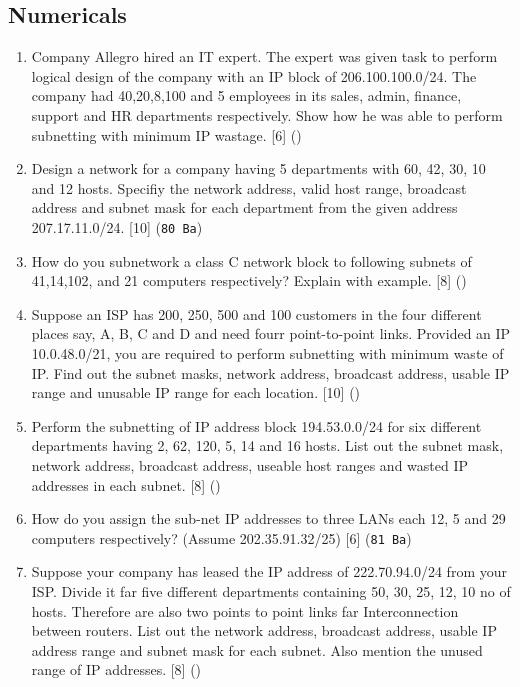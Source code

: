 \documentclass[12pt]{article}
\begin{document}
	\subsection{Numericals}
		\begin{enumerate}
			\item Company Allegro hired an IT expert. The expert was given task to perform logical design of the company with an IP block of 206.100.100.0/24. The company had 40,20,8,100 and 5 employees in its sales, admin, finance, support and HR departments respectively. Show how he was able to perform subnetting with minimum IP wastage. \hfill [6] ()

			\item Design a network for a company having 5 departments with 60, 42, 30, 10 and 12 hosts. Specifiy the network address, valid host range, broadcast address and subnet mask for each department from the given address 207.17.11.0/24. \hfill [10] (\texttt{80 Ba})
			
			\item How do you subnetwork a class C network block to following subnets of 41,14,102, and 21 computers respectively? Explain with example. \hfill [8] ()

			\item Suppose an ISP has 200, 250, 500 and 100 customers in the four different places say, A, B, C and D and need fourr point-to-point links. Provided an IP 10.0.48.0/21, you are required to perform subnetting with minimum waste of IP. Find out the subnet masks, network address, broadcast address, usable IP range and unusable IP range for each location. \hfill [10] ()

			\item Perform the subnetting of IP address block 194.53.0.0/24 for six different departments having 2, 62, 120, 5, 14 and 16 hosts. List out the subnet mask, network address, broadcast address, useable host ranges and wasted IP addresses in each subnet. \hfill [8] ()

			\item How do you assign the sub-net IP addresses to three LANs each 12, 5 and 29 computers respectively? (Assume 202.35.91.32/25) \hspace{9cm} [6] (\texttt{81 Ba})

			\item Suppose your company has leased the IP address of 222.70.94.0/24 from your ISP. Divide it far five different departments containing 50, 30, 25, 12, 10 no of hosts. Therefore are also two points to point links far Interconnection between routers. List out the network address, broadcast address, usable IP address range and subnet mask for each subnet. Also mention the unused range of IP addresses. \hfill [8] ()


\end{enumerate}
\end{document}

